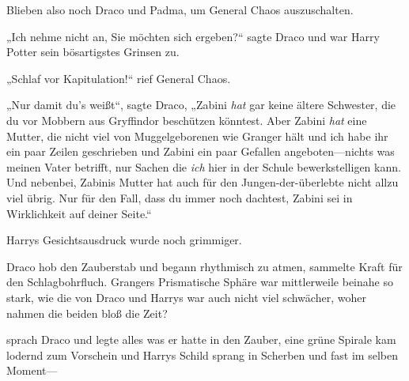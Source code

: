 Blieben also noch Draco und Padma, um General Chaos auszuschalten.

„Ich nehme nicht an, Sie möchten sich ergeben?“ sagte Draco und war Harry Potter sein bösartigstes Grinsen zu.

„Schlaf vor Kapitulation!“ rief General Chaos.

„Nur damit du’s weißt“, sagte Draco, „Zabini \emph{hat} gar keine ältere Schwester, die du vor Mobbern aus Gryffindor beschützen könntest. Aber Zabini \emph{hat} eine Mutter, die nicht viel von Muggelgeborenen wie Granger hält und ich habe ihr ein paar Zeilen geschrieben und Zabini ein paar Gefallen angeboten—nichts was meinen Vater betrifft, nur Sachen die \emph{ich} hier in der Schule bewerkstelligen kann. Und nebenbei, Zabinis Mutter hat auch für den Jungen-der-überlebte nicht allzu viel übrig. Nur für den Fall, dass du immer noch dachtest, Zabini sei in Wirklichkeit auf deiner Seite.“

Harrys Gesichtsausdruck wurde noch grimmiger.

Draco hob den Zauberstab und begann rhythmisch zu atmen, sammelte Kraft für den Schlagbohrfluch. Grangers Prismatische Sphäre war mittlerweile beinahe so stark, wie die von Draco und Harrys war auch nicht viel schwächer, woher nahmen die beiden bloß die Zeit?

 sprach Draco und legte alles was er hatte in den Zauber, eine grüne Spirale kam lodernd zum Vorschein und Harrys Schild sprang in Scherben und fast im selben Moment—

